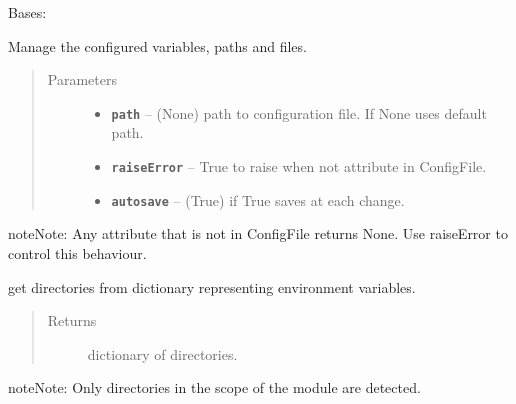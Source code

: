 \documentclass[letterpaper,10pt,english]{sphinxmanual}
\begin{document}
\begin{fulllineitems}
\label{RRtoolbox.lib:RRtoolbox.lib.config.DirectoryManager}
Bases: 

Manage the configured variables, paths and files.
\begin{quote}\begin{description}
\item[{Parameters}] \leavevmode\begin{itemize}
\item {} 
\textbf{\texttt{path}} -- (None) path to configuration file. If None uses default path.

\item {} 
\textbf{\texttt{raiseError}} -- True to raise when not attribute in ConfigFile.

\item {} 
\textbf{\texttt{autosave}} -- (True) if True saves at each change.

\end{itemize}

\end{description}\end{quote}

\begin{notice}{note}{Note:}
Any attribute that is not in ConfigFile returns None.
Use raiseError to control this behaviour.
\end{notice}

\begin{fulllineitems}
\label{RRtoolbox.lib:RRtoolbox.lib.config.DirectoryManager.default}
get directories from dictionary representing environment variables.
\begin{quote}\begin{description}
\item[{Returns}] \leavevmode
dictionary of directories.

\end{description}\end{quote}

\begin{notice}{note}{Note:}
Only directories in the scope of the module are detected.
\end{notice}

\end{fulllineitems}


\end{fulllineitems}
\end{document}
